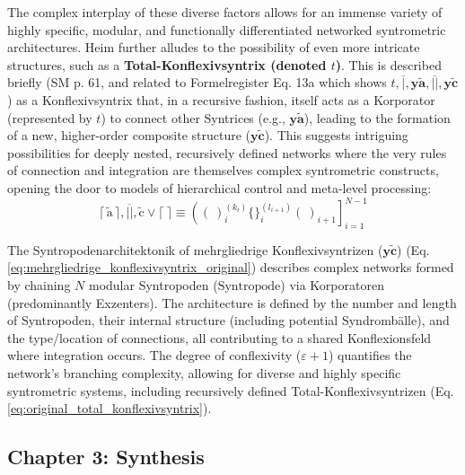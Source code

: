 \documentclass[12pt]{article}
\newcommand{\syntrix}{\bm{y\widetilde{a}}}
\newcommand{\konflexivsyntrix}{\bm{y\widetilde{c}}}
\newcommand{\syntropode}{\text{Syntropode}}
\begin{document}
\begin{itemize}
\begin{enumerate}
    \end{enumerate}
    The complex interplay of these diverse factors allows for an immense variety of highly specific, modular, and functionally differentiated networked syntrometric architectures. Heim further alludes to the possibility of even more intricate structures, such as a \textbf{Total-Konflexivsyntrix (denoted \( t \))}. This is described briefly (SM p. 61, and related to Formelregister Eq. 13a which shows \( t, \overline{|}, \syntrix, \overline{||}, \konflexivsyntrix \)) as a Konflexivsyntrix that, in a recursive fashion, itself acts as a Korporator (represented by \( t \)) to connect other Syntrices (e.g., \( \syntrix \)), leading to the formation of a new, higher-order composite structure (\( \konflexivsyntrix \)). This suggests intriguing possibilities for deeply nested, recursively defined networks where the very rules of connection and integration are themselves complex syntrometric constructs, opening the door to models of hierarchical control and meta-level processing:
    \begin{equation}
\lceil \, \tilde{\mathrm{a}} \, \rceil, \overline{||}, \tilde{\mathrm{c}} \lor \lceil \ \rceil \equiv \left( (\ )_i^{(k_i)} \{ \}_i^{(l_{i+1})} (\ )_{i+1} \right]_{i=1}^{N-1}
\label{eq:original_total_konflexivsyntrix}
\tag{13a}
\end{equation}
\end{itemize}

The Syntropodenarchitektonik of mehrgliedrige Konflexivsyntrizen (\(\konflexivsyntrix\)) (Eq. \eqref{eq:mehrgliedrige_konflexivsyntrix_original}) describes complex networks formed by chaining \(N\) modular Syntropoden (\(\syntropode\)) via Korporatoren (predominantly Exzenters). The architecture is defined by the number and length of Syntropoden, their internal structure (including potential Syndrombälle), and the type/location of connections, all contributing to a shared Konflexionsfeld where integration occurs. The degree of conflexivity (\(\varepsilon+1\)) quantifies the network's branching complexity, allowing for diverse and highly specific syntrometric systems, including recursively defined Total-Konflexivsyntrizen (Eq. \eqref{eq:original_total_konflexivsyntrix}).

\subsection{Chapter 3: Synthesis}
\label{sec:chapter3_synthesis}
\end{document}
